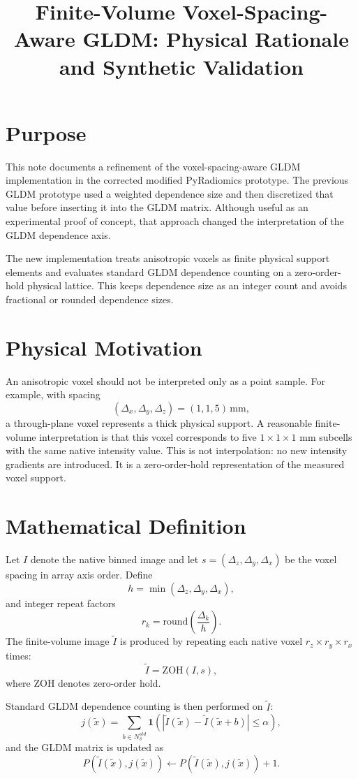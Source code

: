 \documentclass[11pt,a4paper]{article}
\title{Finite-Volume Voxel-Spacing-Aware GLDM: Physical Rationale and Synthetic Validation}
\author{}
\date{}
\begin{document}
\maketitle

\section*{Purpose}
This note documents a refinement of the voxel-spacing-aware GLDM implementation in the corrected modified PyRadiomics prototype. The previous GLDM prototype used a weighted dependence size and then discretized that value before inserting it into the GLDM matrix. Although useful as an experimental proof of concept, that approach changed the interpretation of the GLDM dependence axis.

The new implementation treats anisotropic voxels as finite physical support elements and evaluates standard GLDM dependence counting on a zero-order-hold physical lattice. This keeps dependence size as an integer count and avoids fractional or rounded dependence sizes.

\section*{Physical Motivation}
An anisotropic voxel should not be interpreted only as a point sample. For example, with spacing
\[
(\Delta_x,\Delta_y,\Delta_z)=(1,1,5)\,\mathrm{mm},
\]
a through-plane voxel represents a thick physical support. A reasonable finite-volume interpretation is that this voxel corresponds to five \(1\times1\times1\) mm subcells with the same native intensity value. This is not interpolation: no new intensity gradients are introduced. It is a zero-order-hold representation of the measured voxel support.

\section*{Mathematical Definition}
Let \(I\) denote the native binned image and let \(s=(\Delta_z,\Delta_y,\Delta_x)\) be the voxel spacing in array axis order. Define
\[
h = \min(\Delta_z,\Delta_y,\Delta_x),
\]
and integer repeat factors
\[
r_k = \mathrm{round}\left(\frac{\Delta_k}{h}\right).
\]
The finite-volume image \(\tilde I\) is produced by repeating each native voxel \(r_z\times r_y\times r_x\) times:
\[
\tilde I = \mathrm{ZOH}(I,s),
\]
where ZOH denotes zero-order hold.

Standard GLDM dependence counting is then performed on \(\tilde I\):
\[
j(\tilde x)=
\sum_{b\in N_{\delta}^{std}}
\mathbf{1}\left(|\tilde I(\tilde x)-\tilde I(\tilde x+b)|\leq\alpha\right),
\]
and the GLDM matrix is updated as
\[
P(\tilde I(\tilde x),j(\tilde x)) \leftarrow
P(\tilde I(\tilde x),j(\tilde x))+1.
\]
\end{document}
